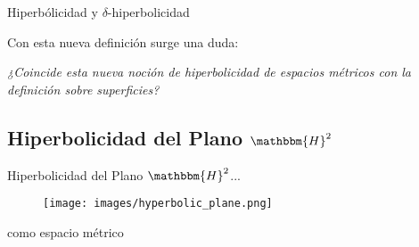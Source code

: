 \documentclass[xcolor=dvipsnames,aspectratio=159]{beamer}
\theoremstyle{largebreak}
\newcommand{\bbm}[1]{\ensuremath{\mathbbm{#1}}}
\begin{document}
\begin{frame}{Hiperbólicidad y $\delta$-hiperbolicidad}
    \begin{center}
        \Large Con esta nueva definición surge una duda:
        
        \pause

        \hfill\break

        \textit{¿Coincide esta nueva noción de hiperbolicidad de espacios métricos con la definición sobre superficies?}
    \end{center}
\end{frame}

\subsection{Hiperbolicidad del Plano $\bbm{H}^2$}

\begin{frame}
    \begin{center}
        \Large Hiperbolicidad del Plano $\bbm{H}^2$...
    \end{center}
    \begin{figure}
        \begin{center}
            \texttt{[image: images/hyperbolic\_plane.png]}
        \end{center}
    \end{figure}

    \pause

    \begin{center}
        como espacio métrico
    \end{center}
    
\end{frame}
\end{document}
